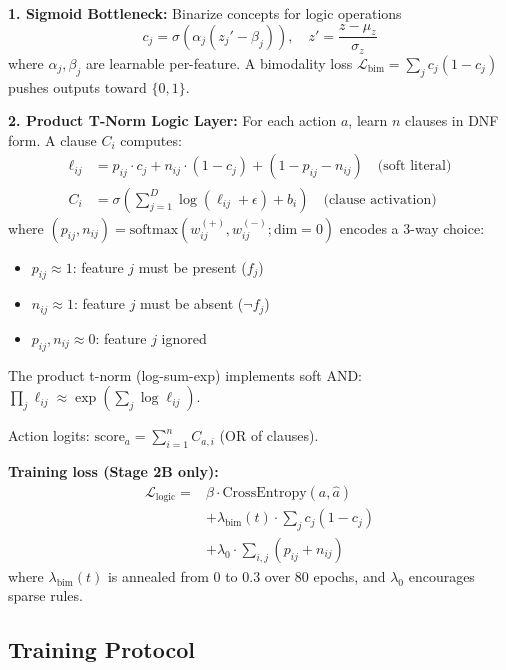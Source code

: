 \documentclass[11pt,twocolumn]{article}
\begin{document}
\textbf{1. Sigmoid Bottleneck:} Binarize concepts for logic operations
\begin{equation}
c_j = \sigma(\alpha_j(z_j' - \beta_j)), \quad z' = \frac{z - \mu_z}{\sigma_z}
\end{equation}
where $\alpha_j, \beta_j$ are learnable per-feature. A bimodality loss $\mathcal{L}_\text{bim} = \sum_j c_j(1-c_j)$ pushes outputs toward $\{0,1\}$.

\textbf{2. Product T-Norm Logic Layer:} For each action $a$, learn $n$ clauses in DNF form. A clause $C_i$ computes:
\begin{align}
\ell_{ij} &= p_{ij} \cdot c_j + n_{ij} \cdot (1 - c_j) + (1 - p_{ij} - n_{ij}) \quad \text{(soft literal)} \\
C_i &= \sigma\left(\sum_{j=1}^D \log(\ell_{ij} + \epsilon) + b_i\right) \quad \text{(clause activation)}
\end{align}
where $(p_{ij}, n_{ij}) = \text{softmax}(w_{ij}^{(+)}, w_{ij}^{(-)}; \text{dim}=0)$ encodes a 3-way choice:
\begin{itemize}
\item $p_{ij} \approx 1$: feature $j$ must be present ($f_j$)
\item $n_{ij} \approx 1$: feature $j$ must be absent ($\neg f_j$)
\item $p_{ij}, n_{ij} \approx 0$: feature $j$ ignored
\end{itemize}

The product t-norm (log-sum-exp) implements soft AND: $\prod_j \ell_{ij} \approx \exp(\sum_j \log \ell_{ij})$.

Action logits: $\text{score}_a = \sum_{i=1}^n C_{a,i}$ (OR of clauses).

\textbf{Training loss (Stage 2B only):}
\begin{align}
\mathcal{L}_\text{logic} = &\beta \cdot \text{CrossEntropy}(a, \hat{a}) \\
&+ \lambda_\text{bim}(t) \cdot \sum_j c_j(1-c_j) \\
&+ \lambda_0 \cdot \sum_{i,j} (p_{ij} + n_{ij})
\end{align}
where $\lambda_\text{bim}(t)$ is annealed from 0 to 0.3 over 80 epochs, and $\lambda_0$ encourages sparse rules.

\subsection{Training Protocol}
\end{document}

